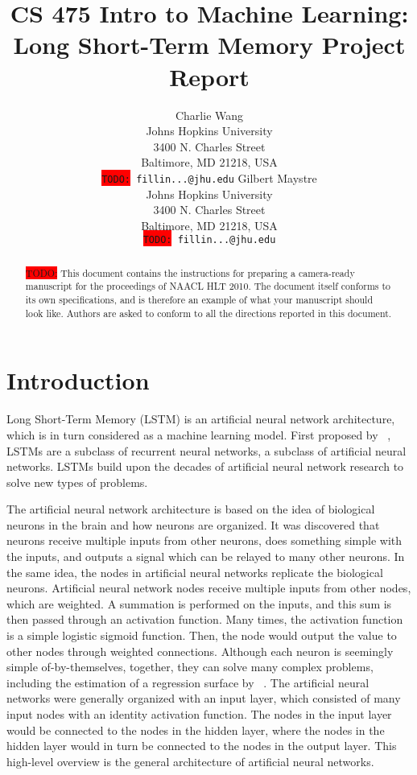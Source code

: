 \documentclass[11pt,letterpaper]{article}
\title{CS 475 Intro to Machine Learning: Long Short-Term Memory Project Report}
\author{Charlie Wang\\
  Johns Hopkins University\\
  3400 N. Charles Street\\
  Baltimore, MD 21218, USA\\
  {\tt \colorbox{red}{TODO:} fillin...@jhu.edu}
  \And
  Gilbert Maystre \\
  Johns Hopkins University\\
  3400 N. Charles Street\\
  Baltimore, MD 21218, USA\\
  {\tt \colorbox{red}{TODO:} fillin...@jhu.edu}}
\date{}
\begin{document}
\maketitle
\begin{abstract}
  \colorbox{red}{TODO:} This document contains the instructions for preparing a camera-ready
  manuscript for the proceedings of NAACL HLT 2010. The document itself conforms
  to its own specifications, and is therefore an example of what
  your manuscript should look like.  Authors are asked to conform to
  all the directions reported in this document.
\end{abstract}

\section{Introduction}

Long Short-Term Memory (LSTM) is an artificial neural network architecture, which is in turn considered as a machine learning model. First proposed by ~\cite{Hochreiter:97}, LSTMs are a subclass of recurrent neural networks, a subclass of artificial neural networks. LSTMs build upon the decades of artificial neural network research to solve new types of problems.

The artificial neural network architecture is based on the idea of biological neurons in the brain and how neurons are organized. It was discovered that neurons receive multiple inputs from other neurons, does something simple with the inputs, and outputs a signal which can be relayed to many other neurons. In the same idea, the nodes in artificial neural networks replicate the biological neurons. Artificial neural network nodes receive multiple inputs from other nodes, which are weighted. A summation is performed on the inputs, and this sum is then passed through an activation function. Many times, the activation function is a simple logistic sigmoid function. Then, the node would output the value to other nodes through weighted connections. Although each neuron is seemingly simple of-by-themselves, together, they can solve many complex problems, including the estimation of a regression surface by ~\cite{Specht:91}. The artificial neural networks were generally organized with an input layer, which consisted of many input nodes with an identity activation function. The nodes in the input layer would be connected to the nodes in the hidden layer, where the nodes in the hidden layer would in turn be connected to the nodes in the output layer. This high-level overview is the general architecture of artificial neural networks. 
 
\end{document}
